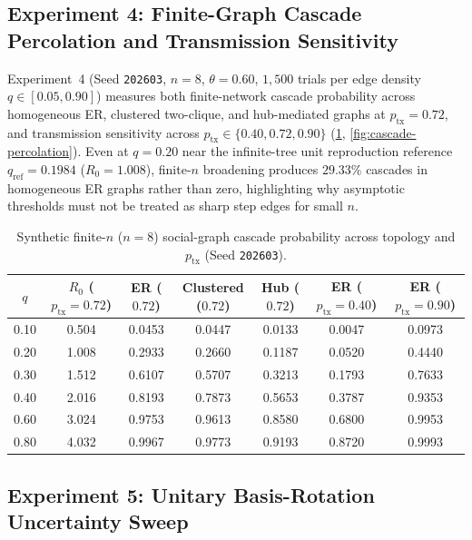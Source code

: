 \subsection{Experiment 4: Finite-Graph Cascade Percolation and Transmission Sensitivity}
\label{subsec:sim-cascade}

Experiment~4 (Seed \texttt{202603}, $n = 8$, $\theta = 0.60$, $1{,}500$ trials per edge
density $q \in [0.05, 0.90]$) measures both finite-network cascade probability across
homogeneous ER, clustered two-clique, and hub-mediated graphs at $p_{\mathrm{tx}} = 0.72$,
and transmission sensitivity across $p_{\mathrm{tx}} \in \{0.40, 0.72, 0.90\}$
(\cref{tab:cascade-sim}, \cref{fig:cascade-percolation}). Even at $q = 0.20$ near the
infinite-tree unit reproduction reference $q_{\mathrm{ref}} = 0.1984$ ($R_0 = 1.008$),
finite-$n$ broadening produces $29.33\%$ cascades in homogeneous ER graphs rather than
zero, highlighting why asymptotic thresholds must not be treated as sharp step edges for small $n$.

\begin{table}[htbp]
\centering
\small
\caption{Synthetic finite-$n$ ($n=8$) social-graph cascade probability across topology and $p_{\mathrm{tx}}$ (Seed \texttt{202603}).}
\label{tab:cascade-sim}
\begin{tabular}{@{}ccccccc@{}}
\toprule
$q$ & $R_0$ ($p_{\mathrm{tx}}{=}0.72$) & ER ($0.72$) & Clustered ($0.72$) & Hub ($0.72$) & ER ($p_{\mathrm{tx}}{=}0.40$) & ER ($p_{\mathrm{tx}}{=}0.90$) \\
\midrule
0.10 & 0.504 & 0.0453 & 0.0447 & 0.0133 & 0.0047 & 0.0973 \\
0.20 & 1.008 & 0.2933 & 0.2660 & 0.1187 & 0.0520 & 0.4440 \\
0.30 & 1.512 & 0.6107 & 0.5707 & 0.3213 & 0.1793 & 0.7633 \\
0.40 & 2.016 & 0.8193 & 0.7873 & 0.5653 & 0.3787 & 0.9353 \\
0.60 & 3.024 & 0.9753 & 0.9613 & 0.8580 & 0.6800 & 0.9953 \\
0.80 & 4.032 & 0.9967 & 0.9773 & 0.9193 & 0.8720 & 0.9993 \\
\bottomrule
\end{tabular}
\end{table}

\subsection{Experiment 5: Unitary Basis-Rotation Uncertainty Sweep}
\label{subsec:sim-uncertainty}

